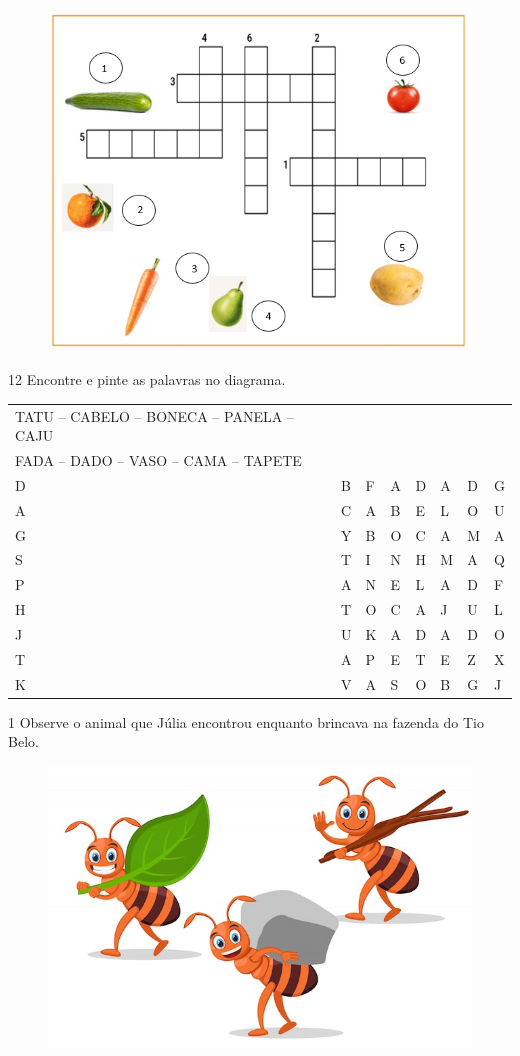 \begin{figure}[htpb!]
\includegraphics[width=\textwidth]{media/image40.png}
\end{figure}

\num{12} Encontre e pinte as palavras no diagrama.


\begin{longtable}[]{@{}llllllll@{}}
\toprule
	TATU -- CABELO -- BONECA -- PANELA -- CAJU\tabularnewline
FADA -- DADO -- VASO -- CAMA -- TAPETE\tabularnewline
\midrule
D & B & F & A & D & A & D & G\tabularnewline
A & C & A & B & E & L & O & U\tabularnewline
G & Y & B & O & C & A & M & A\tabularnewline
S & T & I & N & H & M & A & Q\tabularnewline
P & A & N & E & L & A & D & F\tabularnewline
H & T & O & C & A & J & U & L\tabularnewline
J & U & K & A & D & A & D & O\tabularnewline
T & A & P & E & T & E & Z & X\tabularnewline
K & V & A & S & O & B & G & J\tabularnewline
\end{longtable}

\pagebreak
{}

\num{1} Observe o animal que Júlia encontrou enquanto brincava na 
fazenda do Tio Belo.

\begin{figure}[htpb!]
\centering
\includegraphics[width=.9\textwidth]{media/image42.jpeg}
\end{figure}

